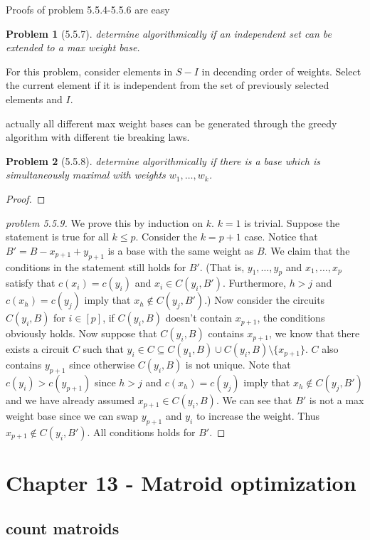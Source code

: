 \documentclass[12pt]{article}
\newtheorem*{nproblem}{Problem}
\begin{document}
Proofs of problem 5.5.4-5.5.6 are easy

\begin{nproblem}[5.5.7]
    determine algorithmically if an independent set can be extended to a max weight base.
\end{nproblem}
For this problem, consider elements in $S-I$ in decending order of weights. Select the current element if it is independent from the set of previously selected elements and $I$.

actually all different max weight bases can be generated through the greedy algorithm with different tie breaking laws. 

\begin{nproblem}[5.5.8]
    determine algorithmically if there is a base which is simultaneously maximal with weights $w_1,\dots,w_k$.
\end{nproblem}
\begin{proof}
\end{proof}

\begin{proof}[problem 5.5.9]
    We prove this by induction on $k$. $k=1$ is trivial. Suppose the statement is true for all $k\leq p$. Consider the $k=p+1$ case. Notice that $B'=B-x_{p+1}+y_{p+1}$ is a base with the same weight as $B$. We claim that the conditions in the statement still holds for $B'$.
    (That is, $y_1,\dots,y_{p}$ and $x_1,\dots,x_{p}$ satisfy that $c(x_i)=c(y_i)$ and $x_i\in C(y_i,B')$. Furthermore, $h>j$ and $c(x_h)=c(y_j)$ imply that $x_h \notin C(y_j,B')$.)
    Now consider the circuits $C(y_i,B)$ for $i\in [p]$, if $C(y_i,B)$ doesn't contain $x_{p+1}$, the conditions obviously holds. Now suppose that $C(y_i,B)$ contains $x_{p+1}$, we know that there exists a circuit $C$ such that  $y_i\in C\subseteq C(y_1,B)\cup C(y_i,B)\setminus \{x_{p+1}\}$. $C$ also contains $y_{p+1}$ since otherwise $C(y_i,B)$ is not unique. Note that $c(y_i)>c(y_{p+1})$ since $h>j$ and $c(x_h)=c(y_j)$ imply that $x_h \notin C(y_j,B')$ and we have already assumed $x_{p+1}\in C(y_i,B)$.
    We can see that $B'$ is not a max weight base since we can swap $y_{p+1}$ and $y_i$ to increase the weight. Thus $x_{p+1}\notin C(y_i,B')$. All conditions holds for $B'$.
\end{proof}

\section{Chapter 13 - Matroid optimization}
\subsection{count matroids}



\newpage


\end{document}
